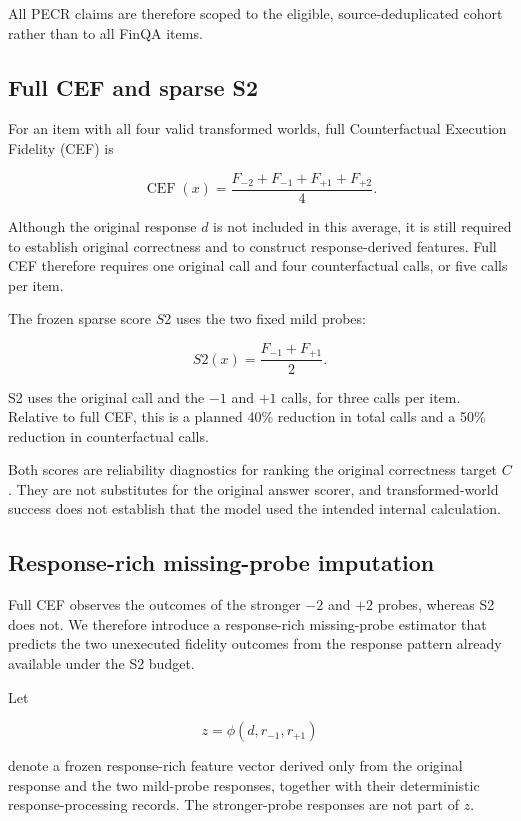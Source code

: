 \documentclass[11pt]{article}
\begin{document}
All PECR claims are therefore scoped to the eligible, source-deduplicated cohort rather than to all FinQA items.

\subsection{Full CEF and sparse S2}

For an item with all four valid transformed worlds, full Counterfactual Execution Fidelity (CEF) is

\[
\operatorname{CEF}(x)
=
\frac{
F_{-2}+F_{-1}+F_{+1}+F_{+2}
}{4}.
\]

Although the original response \(d\) is not included in this average, it is still required to establish original correctness and to construct response-derived features. Full CEF therefore requires one original call and four counterfactual calls, or five calls per item.

The frozen sparse score \(S2\) uses the two fixed mild probes:

\[
S2(x)
=
\frac{F_{-1}+F_{+1}}{2}.
\]

S2 uses the original call and the \(-1\) and \(+1\) calls, for three calls per item. Relative to full CEF, this is a planned 40\% reduction in total calls and a 50\% reduction in counterfactual calls.

Both scores are reliability diagnostics for ranking the original correctness target \(C\). They are not substitutes for the original answer scorer, and transformed-world success does not establish that the model used the intended internal calculation.

\subsection{Response-rich missing-probe imputation}

Full CEF observes the outcomes of the stronger \(-2\) and \(+2\) probes, whereas S2 does not. We therefore introduce a response-rich missing-probe estimator that predicts the two unexecuted fidelity outcomes from the response pattern already available under the S2 budget.

Let

\[
z=\phi\!\left(d,r_{-1},r_{+1}\right)
\]

denote a frozen response-rich feature vector derived only from the original response and the two mild-probe responses, together with their deterministic response-processing records. The stronger-probe responses are not part of \(z\).
\end{document}

